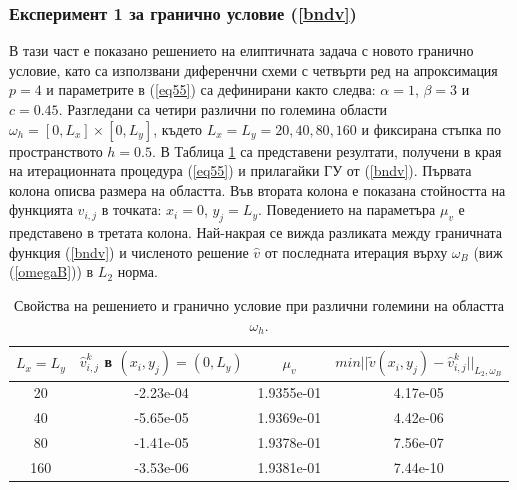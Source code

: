 \documentclass[a4paper]{article}
\newcommand{\rf}[1]{(\ref{#1})}
\theoremstyle{remark}
\begin{document}
\begin{large}
\subsubsection{Експеримент 1 за  гранично условие \rf{bndv}}
В тази част е показано решението на елиптичната задача с новото гранично условие, като са използвани диференчни схеми с четвърти ред на апроксимация $p=4$ и параметрите в \rf{eq55} са дефинирани както следва: $\alpha = 1$, $\beta = 3$ и $c=0.45$. Разгледани са четири различни по големина области $\omega_h = [0, L_x] \times [0, L_y]$, където $L_x = L_y = 20, 40, 80, 160$ и фиксирана стъпка по пространството $h=0.5$. В Таблица \ref{tab:valBnd1} са представени резултати, получени в края на итерационната процедура \rf{eq55} и прилагайки ГУ от \rf{bndv}. Първата колона описва размера на областта. Във втората колона е показана стойността на функцията $\widehat{v}_{i,j}$ в точката: ${x}_i = 0$, $ {y}_j =   L_{ y}$. Поведението на параметъра $\mu_v$ е представено в третата колона. Най-накрая се вижда разликата между граничната функция \rf{bndv} и численото решение $\widehat{v}$ от последната итерация върху $\omega_B$ (виж \rf{omegaB}) в $L_2$ норма.
\begin{table}[ht]
\centering
		\begin{tabular}{||c||c|c|c||}
			\hline
			\hline
      $ L_{ x} = L_{ y}$        &         $\widehat{v}_{i,j}^k$ в  $({x}_i, {y}_j) = (0, L_{ y})$    &    $\mu_v$  &   \mbox{$min|| \tilde v( x_i, y_j) - \widehat v ^k_{i,j} ||_{L_2,\omega_B}$}\\
   			\hline
			\hline
      20    & -2.23e-04    &  1.9355e-01  &     4.17e-05  \\
               	 \hline
    40      & -5.65e-05   &   1.9369e-01    &    4.42e-06 \\
			\hline 	
      80    & -1.41e-05  &      1.9378e-01      &       7.56e-07  \\
			\hline 	
     160     & -3.53e-06  &    1.9381e-01        &     7.44e-10 \\
		   \hline
	             \hline
                     \end{tabular}
\caption{Свойства на решението и гранично условие при различни големини на областта $\omega_h$.}
\label{tab:valBnd1}
\end{table}
\FloatBarrier


\end{large}
\end{document}
